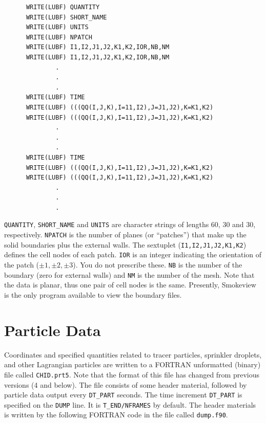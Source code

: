 \documentclass[11pt]{book}
\newcommand{\ct}{\tt\small}
\begin{document}
\footnotesize
\begin{verbatim}
      WRITE(LUBF) QUANTITY
      WRITE(LUBF) SHORT_NAME
      WRITE(LUBF) UNITS
      WRITE(LUBF) NPATCH
      WRITE(LUBF) I1,I2,J1,J2,K1,K2,IOR,NB,NM
      WRITE(LUBF) I1,I2,J1,J2,K1,K2,IOR,NB,NM
              .
              .
              .
      WRITE(LUBF) TIME
      WRITE(LUBF) (((QQ(I,J,K),I=11,I2),J=J1,J2),K=K1,K2)
      WRITE(LUBF) (((QQ(I,J,K),I=11,I2),J=J1,J2),K=K1,K2)
              .
              .
              .
      WRITE(LUBF) TIME
      WRITE(LUBF) (((QQ(I,J,K),I=11,I2),J=J1,J2),K=K1,K2)
      WRITE(LUBF) (((QQ(I,J,K),I=11,I2),J=J1,J2),K=K1,K2)
              .
              .
              .
\end{verbatim}
\normalsize
{\ct QUANTITY}, {\ct SHORT\_NAME} and {\ct UNITS} are character
strings of lengths 60, 30 and 30, respectively.
{\ct NPATCH} is the number of planes (or ``patches'') that make up the
solid boundaries plus the external walls.
The sextuplet ({\ct I1,I2,J1,J2,K1,K2}) defines the cell nodes of each
patch. {\ct IOR} is an integer indicating the orientation of the
patch ($\pm 1,\pm 2,\pm 3$). You do not prescribe these.
{\ct NB} is the number of the boundary (zero for external walls) and
{\ct NM} is the number of the mesh.  Note that the data is planar,
thus one pair of cell nodes is the same. Presently, Smokeview is the
only program available to view the boundary files.

\section{Particle Data}
\label{out:PART}

Coordinates and specified quantities related to tracer particles, sprinkler droplets, and other Lagrangian particles are written
to a FORTRAN unformatted (binary) file called {\ct CHID.prt5}.
Note that the format of this file has changed from previous versions (4 and below).
The file consists of some header material, followed by particle data output every
{\ct DT\_PART} seconds. The time increment {\ct DT\_PART} is specified on the
{\ct DUMP} line. It is {\ct T\_END/NFRAMES} by default.
The header materials is written by the following FORTRAN code in the file called {\ct dump.f90}.
\end{document}
